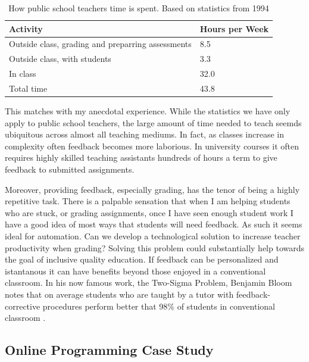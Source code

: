 \begin{table}[h]
 \centering
 \begin{tabular}{ l l }
	Activity & Hours per Week \\
   \toprule
   Outside class, grading and preparring assessments & 8.5 \\
  Outside class, with students & 3.3 \\
  In class & 32.0 \\
  Total time & 43.8
  \end{tabular}
  \caption[Teacher time]{How public school teachers time is spent. Based on statistics from 1994 \cite{henke1996schools}}
 \label{tab:dataTable}
\end{table}

This matches with my anecdotal experience. While the statistics we have only apply to public school teachers, the large amount of time needed to teach seemds ubiquitous across almost all teaching mediums. In fact, as classes increase in complexity often feedback becomes more laborious. In university courses it often requires highly skilled teaching assistants hundreds of hours a term to give feedback to submitted assignments.

Moreover, providing feedback, especially grading, has the tenor of being a highly repetitive task. There is a palpable sensation that when I am helping students who are stuck, or grading assignments, once I have seen enough student work I have a good idea of most ways that students will need feedback. As such it seems ideal for automation. Can we develop a technological solution to increase teacher productivity when grading? Solving this problem could substantially help towards the goal of inclusive quality education. If feedback can be personalized and istantanous it can have benefits beyond those enjoyed in a conventional classroom. In his now famous work, the Two-Sigma Problem, Benjamin Bloom notes that on average students who are taught by a tutor with feedback-corrective procedures perform better that 98\% of students in conventional classroom \cite{corbett2001cognitive}.

\subsection{Online Programming Case Study}

